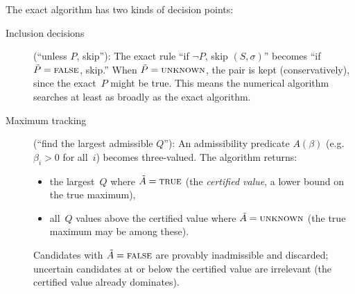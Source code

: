 \begin{remark}%
\label{rem:three-valued-control-flow}
The exact algorithm has two kinds of decision points:
\begin{description}
\item[Inclusion decisions] (``unless $P$, skip''):
  The exact rule ``if $\lnot P$, skip $(S, \sigma)$''
  becomes ``if $\tilde P = \textsc{false}$, skip.''
  When $\tilde P = \textsc{unknown}$, the pair is kept
  (conservatively), since the exact~$P$ might be true.
  This means the numerical algorithm searches at least as
  broadly as the exact algorithm.
\item[Maximum tracking] (``find the largest admissible $Q$''):
  An admissibility predicate $A(\beta)$ (e.g.\ $\beta_i > 0$
  for all~$i$) becomes three-valued.
  The algorithm returns:
  \begin{itemize}
  \item the largest~$Q$ where $\tilde A = \textsc{true}$
    (the \emph{certified value}, a lower bound on the
    true maximum),
  \item all~$Q$ values above the certified value where
    $\tilde A = \textsc{unknown}$
    (the true maximum may be among these).
  \end{itemize}
  Candidates with $\tilde A = \textsc{false}$ are provably
  inadmissible and discarded; uncertain candidates at or below
  the certified value are irrelevant (the certified value already
  dominates).
\end{description}
\end{remark}

